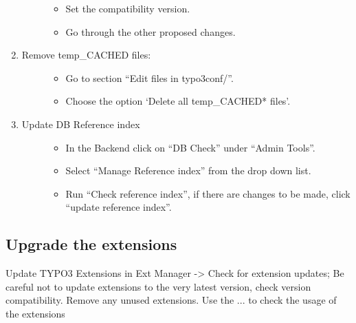 \documentclass[a4paper,11pt,english]{sphinxmanual}
\begin{document}
\begin{enumerate}
\begin{description}
\begin{itemize}
\item {} 
Set the compatibility version.

\item {} 
Go through the other proposed changes.

\end{itemize}

\end{description}

\item {} \begin{description}
\item[{Remove temp\_CACHED files:}] \leavevmode\begin{itemize}
\item {} 
Go to section ``Edit files in typo3conf/''.

\item {} 
Choose the option `Delete all temp\_CACHED* files'.

\end{itemize}

\end{description}

\item {} \begin{description}
\item[{Update DB Reference index}] \leavevmode\begin{itemize}
\item {} 
In the Backend click on ``DB Check'' under ``Admin Tools''.

\item {} 
Select ``Manage Reference index'' from the drop down list.

\item {} 
Run ``Check reference index'', if there are changes to be made, click ``update reference index''.

\end{itemize}

\end{description}

\end{enumerate}


\subsection{Upgrade the extensions}
\label{typo3:upgrade-the-extensions}
Update TYPO3 Extensions in Ext Manager -\textgreater{} Check for extension updates;
Be careful not to update extensions to the very latest version, check version compatibility.
Remove any unused extensions.
Use the ... to check the usage of the extensions
\end{document}
